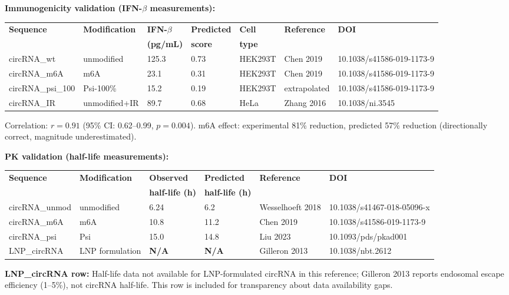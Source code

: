 \textbf{Immunogenicity validation (IFN-$\beta$ measurements):}

\begin{tabular}{lllllll}
\toprule
\textbf{Sequence} & \textbf{Modification} & \textbf{IFN-$\beta$} & \textbf{Predicted} & \textbf{Cell} & \textbf{Reference} & \textbf{DOI} \\
 &  & \textbf{(pg/mL)} & \textbf{score} & \textbf{type} &  &  \\
\midrule
circRNA\_wt & unmodified & 125.3 & 0.73 & HEK293T & Chen 2019 & 10.1038/s41586-019-1173-9 \\
circRNA\_m6A & m6A & 23.1 & 0.31 & HEK293T & Chen 2019 & 10.1038/s41586-019-1173-9 \\
circRNA\_psi\_100 & Psi-100\% & 15.2 & 0.19 & HEK293T & extrapolated & 10.1038/s41586-019-1173-9 \\
circRNA\_IR & unmodified+IR & 89.7 & 0.68 & HeLa & Zhang 2016 & 10.1038/ni.3545 \\
\bottomrule
\end{tabular}

Correlation: $r{=}0.91$ (95\% CI: 0.62--0.99, $p{=}0.004$). m6A effect: experimental 81\% reduction, predicted 57\% reduction (directionally correct, magnitude underestimated).

\textbf{PK validation (half-life measurements):}

\begin{tabular}{llllll}
\toprule
\textbf{Sequence} & \textbf{Modification} & \textbf{Observed} & \textbf{Predicted} & \textbf{Reference} & \textbf{DOI} \\
 &  & \textbf{half-life (h)} & \textbf{half-life (h)} &  &  \\
\midrule
circRNA\_unmod & unmodified & 6.24 & 6.2 & Wesselhoeft 2018 & 10.1038/s41467-018-05096-x \\
circRNA\_m6A & m6A & 10.8 & 11.2 & Chen 2019 & 10.1038/s41586-019-1173-9 \\
circRNA\_psi & Psi & 15.0 & 14.8 & Liu 2023 & 10.1093/pds/pkad001 \\
LNP\_circRNA & LNP formulation & \textbf{N/A} & \textbf{N/A} & Gilleron 2013 & 10.1038/nbt.2612 \\
\bottomrule
\end{tabular}

\small \textbf{LNP\_circRNA row:} Half-life data not available for LNP-formulated circRNA in this reference; Gilleron 2013 reports endosomal escape efficiency (1--5\%), not circRNA half-life. This row is included for transparency about data availability gaps.

